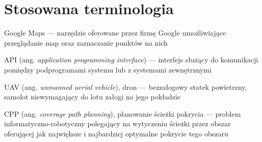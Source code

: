 \chapter{Stosowana terminologia}
\label{chap:terminology}

\begin{description}
   \item Google Maps --- narzędzie oferowane przez firmę Google umożliwiające przeglądanie map oraz zaznaczanie punktów na nich 
   \item API (ang. \textit{application programming interface}) --- interfejs służący do komunikacji pomiędzy podprogramami systemu lub z systemami zewnętrznymi
   \item UAV (ang. \textit{unmanned aerial vehicle}), dron --- bezzałogowy statek powietrzny, samolot niewymagający do lotu załogi na jego pokładzie
   \item CPP (ang. \textit{coverage path planning}), planowanie ścieżki pokrycia --- problem informatyczno-robotyczny polegający na wytyczeniu ścieżki przez obszar oferującej jak największe i najbardziej optymalne pokrycie tego obszaru
\end{description}